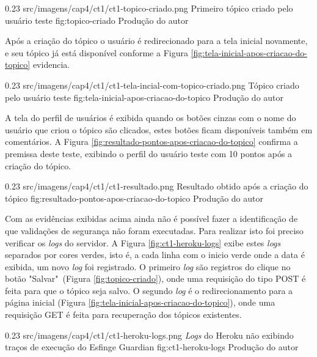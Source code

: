 \begin{image}
{0.23}
{src/imagens/cap4/ct1/ct1-topico-criado.png}
{Primeiro tópico criado pelo usuário teste}
{fig:topico-criado}
{Produção do autor}
\end{image}

\par Após a criação do tópico o usuário é redirecionado para a tela inicial novamente, e seu tópico já está disponível conforme a Figura \ref{fig:tela-inicial-apos-criacao-do-topico} evidencia.

\begin{image}
{0.23}
{src/imagens/cap4/ct1/ct1-tela-incial-com-topico-criado.png}
{Tópico criado pelo usuário teste}
{fig:tela-inicial-apos-criacao-do-topico}
{Produção do autor}
\end{image}

\par A tela do perfil de usuários é exibida quando os botões cinzas com o nome do usuário que criou o tópico são clicados, estes botões ficam disponíveis também em comentários. A Figura \ref{fig:resultado-pontos-apos-criacao-do-topico} confirma a premissa deste teste, exibindo o perfil do usuário teste com 10 pontos após a criação do tópico.

\begin{image}
{0.23}
{src/imagens/cap4/ct1/ct1-resultado.png}
{Resultado obtido após a criação do tópico}
{fig:resultado-pontos-apos-criacao-do-topico}
{Produção do autor}
\end{image}

\par Com as evidências exibidas acima ainda não é possível fazer a identificação de que validações de segurança não foram executadas. Para realizar isto foi preciso verificar os \textit{logs} do servidor. A Figura \ref{fig:ct1-heroku-logs} exibe estes \textit{logs} separados por cores verdes, isto é, a cada linha com o inicio verde onde a data é exibida, um novo \textit{log} foi registrado. O primeiro \textit{log} são registros do clique no botão "Salvar"\ (Figura \ref{fig:topico-criado}), onde uma requisição do tipo POST é feita para que o tópico seja salvo. O segundo \textit{log} é o redirecionamento para a página inicial (Figura \ref{fig:tela-inicial-apos-criacao-do-topico}), onde uma requisição GET é feita para recuperação dos tópicos existentes.

\begin{image}
{0.23}
{src/imagens/cap4/ct1/ct1-heroku-logs.png}
{\textit{Logs} do Heroku não exibindo traços de execução do Esfinge Guardian}
{fig:ct1-heroku-logs}
{Produção do autor}
\end{image}

